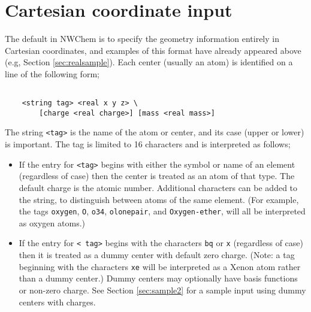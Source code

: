 \section{Cartesian coordinate input}
\label{sec:cart}

The default in NWChem is to specify the geometry information entirely
in Cartesian coordinates, and examples of this format have already
appeared above (e.g, Section \ref{sec:realsample}). Each center
(usually an atom) is identified on a line of the following form;
\begin{verbatim}

    <string tag> <real x y z> \
        [charge <real charge>] [mass <real mass>]

\end{verbatim}

The string \verb+<tag>+ is the name of the atom or center, and its case
(upper or lower) is important.  The tag is limited to 16 characters
and is interpreted as follows;
\begin{itemize}
\item If the entry for \verb+<tag>+ begins with either the symbol or name of an element
  (regardless of case) then the center is treated as an atom of that type.
  The default charge is the atomic number. 
  Additional characters can
  be added to the string, to distinguish between atoms of the same element.
  (For example, the tags \verb+oxygen+, \verb+O+, \verb+o34+, \verb+olonepair+,
  and \verb+Oxygen-ether+, will all be interpreted as oxygen
  atoms.)
\item If the entry for \verb+< tag>+ begins with the characters \verb+bq+ or \verb+x+
  (regardless of case) then it is treated as a dummy center with
  default zero charge.  (Note: a tag beginning with the characters \verb+xe+
  will be interpreted as a Xenon atom rather than a dummy center.)
  Dummy centers may optionally have basis
  functions or non-zero charge.
  See Section \ref{sec:sample2} for
  a sample input using dummy centers with charges.
\end{itemize}

